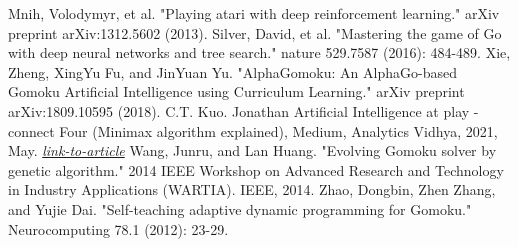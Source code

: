 \documentclass[conference]{IEEEtran}
\begin{document}
\begin{thebibliography}{00}
 Mnih, Volodymyr, et al. "Playing atari with deep reinforcement learning." arXiv preprint arXiv:1312.5602 (2013).
Silver, David, et al. "Mastering the game of Go with deep neural networks and tree search." nature 529.7587 (2016): 484-489.
Xie, Zheng, XingYu Fu, and JinYuan Yu. "AlphaGomoku: An AlphaGo-based Gomoku Artificial Intelligence using Curriculum Learning." arXiv preprint arXiv:1809.10595 (2018).
 C.T. Kuo. Jonathan Artificial Intelligence at play - connect Four (Minimax algorithm explained), Medium, Analytics Vidhya, 2021, May. \href{https://medium.com/analytics-vidhya/artificial-intelligence-at-play-connect-four-minimax-algorithm-explained-3b5fc32e4a4f}{\textit{link-to-article}}
Wang, Junru, and Lan Huang. "Evolving Gomoku solver by genetic algorithm." 2014 IEEE Workshop on Advanced Research and Technology in Industry Applications (WARTIA). IEEE, 2014.
Zhao, Dongbin, Zhen Zhang, and Yujie Dai. "Self-teaching adaptive dynamic programming for Gomoku." Neurocomputing 78.1 (2012): 23-29.

\end{thebibliography}
\end{document}
